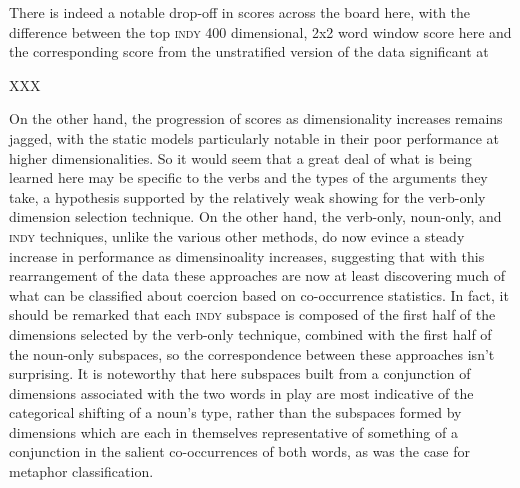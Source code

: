 There is indeed a notable drop-off in scores across the board here, with the difference between the top \textsc{indy} 400 dimensional, 2x2 word window score here and the corresponding score from the unstratified version of the data significant at 

XXX

On the other hand, the progression of scores as dimensionality increases remains jagged, with the static models particularly notable in their poor performance at higher dimensionalities.  So it would seem that a great deal of what is being learned here may be specific to the verbs and the types of the arguments they take, a hypothesis supported by the relatively weak showing for the verb-only dimension selection technique.  On the other hand, the verb-only, noun-only, and \textsc{indy} techniques, unlike the various other methods, do now evince a steady increase in performance as dimensinoality increases, suggesting that with this rearrangement of the data these approaches are now at least discovering much of what can be classified about coercion based on co-occurrence statistics.  In fact, it should be remarked that each \textsc{indy} subspace is composed of the first half of the dimensions selected by the verb-only technique, combined with the first half of the noun-only subspaces, so the correspondence between these approaches isn't surprising.  It is noteworthy that here subspaces built from a conjunction of dimensions associated with the two words in play are most indicative of the categorical shifting of a noun's type, rather than the subspaces formed by dimensions which are each in themselves representative of something of a conjunction in the salient co-occurrences of both words, as was the case for metaphor classification.

